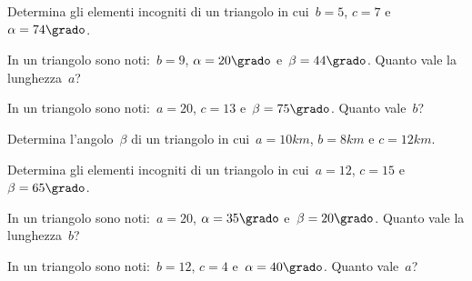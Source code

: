 \begin{multicols}{2}
 \begin{esercizio}
\label{ese:G.68}
Determina gli elementi incogniti di un triangolo in cui~$b=5$, $c=7$ e~$\alpha=74\grado$.
\end{esercizio}

\begin{esercizio}
\label{ese:G.69}
In un triangolo sono noti:~$b=9$, $\alpha=20\grado$ e~$\beta=44\grado$. Quanto vale la lunghezza~$a$?
\end{esercizio}

\begin{esercizio}
\label{ese:G.70}
In un triangolo sono noti:~$a=20$, $c=13$ e~$\beta=75\grado$. Quanto vale~$b$?
\end{esercizio}

\begin{esercizio}
\label{ese:G.71}
Determina l'angolo~$\beta$ di un triangolo in cui~$a=10\unit{km}$, $b=8\unit{km}$ e $c=12\unit{km}$.
\end{esercizio}

\begin{esercizio}
\label{ese:G.72}
Determina gli elementi incogniti di un triangolo in cui~$a=12$, $c=15$ e~$\beta=65\grado$.
\end{esercizio}

\begin{esercizio}
\label{ese:G.73}
In un triangolo sono noti:~$a= 20$, $\alpha=35\grado$ e~$\beta=20\grado$. Quanto vale la lunghezza~$b$?
\end{esercizio}

\begin{esercizio}
\label{ese:G.74}
In un triangolo sono noti:~$b= 12$, $c=4$ e~$\alpha=40\grado$. Quanto vale~$a$?
\end{esercizio}
\end{multicols}

